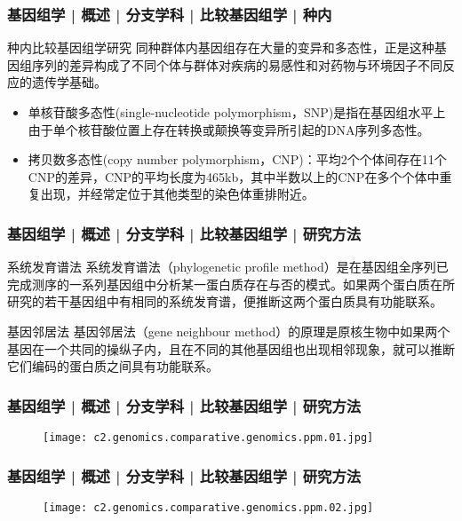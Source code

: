 \begin{frame}
  \frametitle{基因组学 | 概述 | 分支学科 | 比较基因组学 | 种内}
  \begin{block}{种内比较基因组学研究}
同种群体内基因组存在大量的变异和多态性，正是这种基因组序列的差异构成了不同个体与群体对疾病的易感性和对药物与环境因子不同反应的遗传学基础。
\begin{itemize}
  \item 单核苷酸多态性(single-nucleotide polymorphism，SNP)是指在基因组水平上由于单个核苷酸位置上存在转换或颠换等变异所引起的DNA序列多态性。
  \item 拷贝数多态性(copy number polymorphism，CNP)：平均2个个体间存在11个CNP的差异，CNP的平均长度为465kb，其中半数以上的CNP在多个个体中重复出现，并经常定位于其他类型的染色体重排附近。
\end{itemize}
  \end{block}
\end{frame}

\begin{frame}
  \frametitle{基因组学 | 概述 | 分支学科 | 比较基因组学 | 研究方法}
  \begin{block}{系统发育谱法}
系统发育谱法（phylogenetic profile method）是在基因组全序列已完成测序的一系列基因组中分析某一蛋白质存在与否的模式。如果两个蛋白质在所研究的若干基因组中有相同的系统发育谱，便推断这两个蛋白质具有功能联系。
  \end{block}
  \pause
  \begin{block}{基因邻居法}
    基因邻居法（gene neighbour method）的原理是原核生物中如果两个基因在一个共同的操纵子内，且在不同的其他基因组也出现相邻现象，就可以推断它们编码的蛋白质之间具有功能联系。
  \end{block}
\end{frame}

\begin{frame}
  \frametitle{基因组学 | 概述 | 分支学科 | 比较基因组学 | 研究方法}
  \begin{figure}
    \centering
    \texttt{[image: c2.genomics.comparative.genomics.ppm.01.jpg]}
  \end{figure}
\end{frame}

\begin{frame}
  \frametitle{基因组学 | 概述 | 分支学科 | 比较基因组学 | 研究方法}
  \begin{figure}
    \centering
    \texttt{[image: c2.genomics.comparative.genomics.ppm.02.jpg]}
  \end{figure}
\end{frame}


